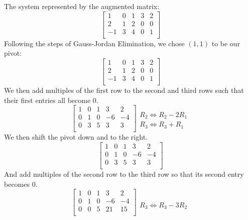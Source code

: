 \documentclass{tufte-book}
\begin{document}
 The system represented by the augmented matrix:
\begin{equation*}
	\left[
		\begin{array}{cccc|c}
			1  & 0 & 1 & 3 & 2 \\
			2  & 1 & 2 & 0 & 0 \\
			-1 & 3 & 4 & 0 & 1 \\
		\end{array}
		\right]
\end{equation*}
Following the steps of Gauss-Jordan Elimination, we chose $(1,1)$ to be our pivot:
\begin{equation*}
	\left[
		\begin{array}{cccc|c}
			\boxed{1} & 0 & 1 & 3 & 2 \\
			2         & 1 & 2 & 0 & 0 \\
			-1        & 3 & 4 & 0 & 1 \\
		\end{array}
		\right]
\end{equation*}
We then add multiples of the first row to the second and third rows such that their first entries all become 0.
\begin{equation*}
	\left[
		\begin{array}{cccc|c}
			\boxed{1} & 0 & 1 & 3  & 2  \\
			0         & 1 & 0 & -6 & -4 \\
			0         & 3 & 5 & 3  & 3  \\
		\end{array}
		\right]
	\begin{array}{l}
		\\
		R_2 \iff R_2 - 2R_1 \\
		R_3 \iff R_3 + R_1
	\end{array}
\end{equation*}
We then shift the pivot down and to the right.
\begin{equation*}
	\left[
		\begin{array}{cccc|c}
			1 & 0         & 1 & 3  & 2  \\
			0 & \boxed{1} & 0 & -6 & -4 \\
			0 & 3         & 5 & 3  & 3  \\
		\end{array}
		\right]
\end{equation*}
And add multiples of the second row to the third row so that its second entry becomes 0.
\begin{equation*}
	\left[
		\begin{array}{cccc|c}
			1 & 0         & 1 & 3  & 2  \\
			0 & \boxed{1} & 0 & -6 & -4 \\
			0 & 0         & 5 & 21 & 15 \\
		\end{array}
		\right]
	\begin{array}{l}
		\\
		\\
		R_3 \iff R_3 - 3R_2
	\end{array}
\end{equation*}
\end{document}
